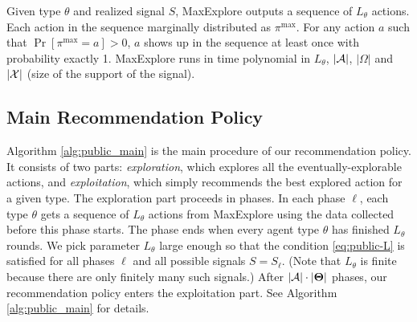 \begin{claim}
\label{clm:maxexplore}
Given type $\theta$ and realized signal $S$, MaxExplore outputs a sequence of $L_{\theta}$ actions.
Each action in the sequence marginally distributed as $\pi^{\max}$.
For any action $a$ such that $\Pr[\pi^{\max} =a] >0$, $a$ shows up in the sequence at least once with probability exactly 1.
MaxExplore runs in time polynomial in $L_{\theta}$, $|\mathcal{A}|$, $|\varOmega|$ and $|\mathcal{X}|$ (size of the support of the signal).
\end{claim}

\subsection{Main Recommendation Policy}
\label{sec:public_main}

Algorithm \ref{alg:public_main} is the main procedure of our recommendation policy. It consists of two parts: \emph{exploration}, which explores all the eventually-explorable actions, and \emph{exploitation}, which simply recommends the best explored action for a given type. The exploration part proceeds in phases. In each phase $\ell$, each type $\theta$ gets a sequence of $L_{\theta}$ actions from MaxExplore using the data collected before this phase starts. The phase ends when every agent type $\theta$ has finished $L_{\theta}$ rounds. We pick parameter $L_{\theta}$ large enough so that the condition
\eqref{eq:public-L} is satisfied for all phases $\ell$ and all possible signals $S=S_\ell$. (Note that $L_{\theta}$ is finite because there are only finitely many such signals.)
  After $|\mathcal{A}| \cdot | \bold{\Theta}|$ phases, our recommendation policy enters the exploitation part. See Algorithm \ref{alg:public_main} for  details.

